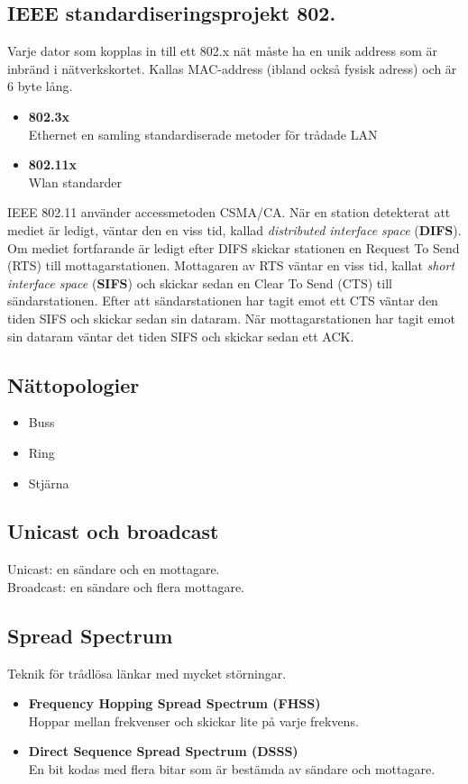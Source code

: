 \documentclass[11pt]{article}
\begin{document}
\subsection{IEEE standardiseringsprojekt 802.}
Varje dator som kopplas in till ett 802.x nät måste ha en unik address som är inbränd i nätverkskortet. Kallas MAC-address (ibland också fysisk adress) och är 6 byte lång. 
\begin{itemize}
\item{\textbf{802.3x} \\ Ethernet en samling standardiserade metoder för trådade LAN}
\item{\textbf{802.11x} \\ Wlan standarder}
\end{itemize}
IEEE 802.11 använder accessmetoden CSMA/CA. När en station detekterat att mediet är ledigt, väntar den en viss tid, kallad \emph{distributed interface space} (\textbf{DIFS}). Om mediet fortfarande är ledigt efter DIFS skickar stationen en Request To Send (RTS) till mottagarstationen. Mottagaren av RTS väntar en viss tid, kallat \emph{short interface space} (\textbf{SIFS}) och skickar sedan en Clear To Send (CTS) till sändarstationen. Efter att sändarstationen har tagit emot ett CTS väntar den tiden SIFS och skickar sedan sin dataram. När mottagarstationen har tagit emot sin dataram väntar det tiden SIFS och skickar sedan ett ACK.
\subsection{Nättopologier}
\begin{itemize}
\item{Buss}
\item{Ring}
\item{Stjärna}
\end{itemize}
\subsection{Unicast och broadcast}
Unicast: en sändare och en mottagare. \\
Broadcast: en sändare och flera mottagare.
\subsection{Spread Spectrum}
Teknik för trådlösa länkar med mycket störningar.
\begin{itemize}
\item{\textbf{Frequency Hopping Spread Spectrum (FHSS)} \\
	Hoppar mellan frekvenser och skickar lite på varje frekvens.}
\item{\textbf{Direct Sequence Spread Spectrum (DSSS)} \\
	En bit kodas med flera bitar som är bestämda av sändare och mottagare.}
\end{itemize}
\end{document}
